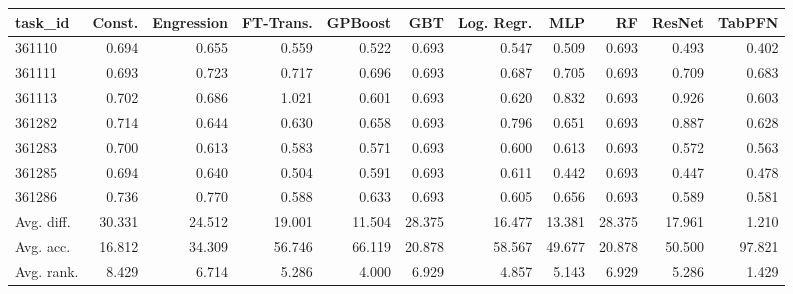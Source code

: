 \begin{tabular}{lrrrrrrrrrr}
\toprule
task\_id & Const. & Engression & FT-Trans. & GPBoost & GBT & Log. Regr. & MLP & RF & ResNet & TabPFN \\
\midrule
361110 & 0.694 & 0.655 & 0.559 & 0.522 & 0.693 & 0.547 & 0.509 & 0.693 & 0.493 & 0.402 \\
361111 & 0.693 & 0.723 & 0.717 & 0.696 & 0.693 & 0.687 & 0.705 & 0.693 & 0.709 & 0.683 \\
361113 & 0.702 & 0.686 & 1.021 & 0.601 & 0.693 & 0.620 & 0.832 & 0.693 & 0.926 & 0.603 \\
361282 & 0.714 & 0.644 & 0.630 & 0.658 & 0.693 & 0.796 & 0.651 & 0.693 & 0.887 & 0.628 \\
361283 & 0.700 & 0.613 & 0.583 & 0.571 & 0.693 & 0.600 & 0.613 & 0.693 & 0.572 & 0.563 \\
361285 & 0.694 & 0.640 & 0.504 & 0.591 & 0.693 & 0.611 & 0.442 & 0.693 & 0.447 & 0.478 \\
361286 & 0.736 & 0.770 & 0.588 & 0.633 & 0.693 & 0.605 & 0.656 & 0.693 & 0.589 & 0.581 \\
Avg. diff. & 30.331 & 24.512 & 19.001 & 11.504 & 28.375 & 16.477 & 13.381 & 28.375 & 17.961 & 1.210 \\
Avg. acc. & 16.812 & 34.309 & 56.746 & 66.119 & 20.878 & 58.567 & 49.677 & 20.878 & 50.500 & 97.821 \\
Avg. rank. & 8.429 & 6.714 & 5.286 & 4.000 & 6.929 & 4.857 & 5.143 & 6.929 & 5.286 & 1.429 \\
\bottomrule
\end{tabular}

